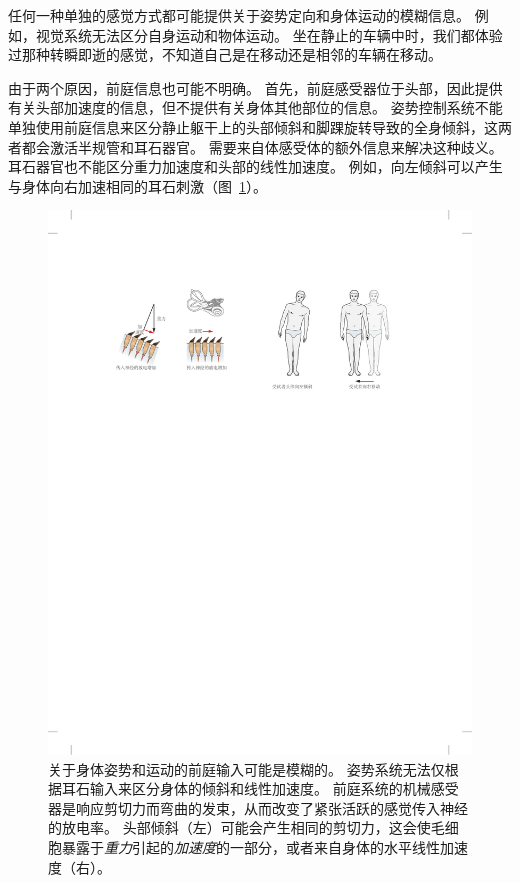任何一种单独的感觉方式都可能提供关于姿势定向和身体运动的模糊信息。
例如，视觉系统无法区分自身运动和物体运动。
坐在静止的车辆中时，我们都体验过那种转瞬即逝的感觉，不知道自己是在移动还是相邻的车辆在移动。


由于两个原因，前庭信息也可能不明确。
首先，前庭感受器位于头部，因此提供有关头部加速度的信息，但不提供有关身体其他部位的信息。
姿势控制系统不能单独使用前庭信息来区分静止躯干上的头部倾斜和脚踝旋转导致的全身倾斜，这两者都会激活半规管和耳石器官。
需要来自体感受体的额外信息来解决这种歧义。
耳石器官也不能区分重力加速度和头部的线性加速度。 
例如，向左倾斜可以产生与身体向右加速相同的耳石刺激（图~\ref{fig:36_11}）。


\begin{figure}[htbp]
	\centering
	\includegraphics[width=1.0\linewidth]{chap36/fig_36_11}
	\caption{关于身体姿势和运动的前庭输入可能是模糊的。
		姿势系统无法仅根据耳石输入来区分身体的倾斜和线性加速度。
		前庭系统的机械感受器是响应剪切力而弯曲的发束，从而改变了紧张活跃的感觉传入神经的放电率。
		头部倾斜（左）可能会产生相同的剪切力，这会使毛细胞暴露于\textit{重力}引起的\textit{加速度}的一部分，或者来自身体的水平线性加速度（右）。}
	\label{fig:36_11}
\end{figure}


